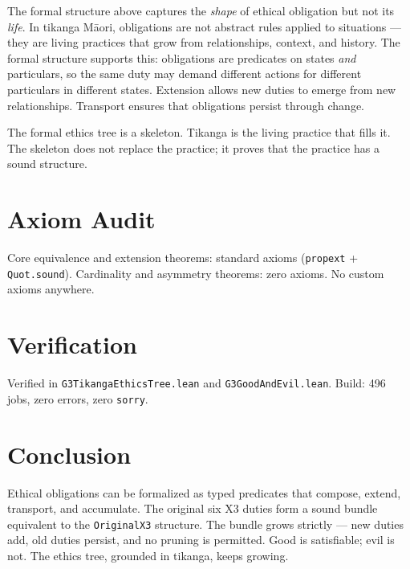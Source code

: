 \documentclass[12pt,a4paper]{article}
\begin{document}
The formal structure above captures the \emph{shape} of ethical obligation
but not its \emph{life}. In tikanga M\={a}ori, obligations are not abstract
rules applied to situations --- they are living practices that grow from
relationships, context, and history. The formal structure supports this:
obligations are predicates on states \emph{and} particulars, so the same
duty may demand different actions for different particulars in different
states. Extension allows new duties to emerge from new relationships.
Transport ensures that obligations persist through change.

The formal ethics tree is a skeleton. Tikanga is the living practice that
fills it. The skeleton does not replace the practice; it proves that the
practice has a sound structure.

\section{Axiom Audit}

Core equivalence and extension theorems: standard axioms
(\texttt{propext} + \texttt{Quot.sound}). Cardinality and asymmetry
theorems: zero axioms. No custom axioms anywhere.

\section{Verification}

Verified in \texttt{G3TikangaEthicsTree.lean} and
\texttt{G3GoodAndEvil.lean}. Build: 496 jobs, zero errors, zero
\texttt{sorry}.

\section{Conclusion}

Ethical obligations can be formalized as typed predicates that compose,
extend, transport, and accumulate. The original six X3 duties form a
sound bundle equivalent to the \texttt{OriginalX3} structure. The bundle
grows strictly --- new duties add, old duties persist, and no pruning is
permitted. Good is satisfiable; evil is not. The ethics tree, grounded in
tikanga, keeps growing.
\end{document}
